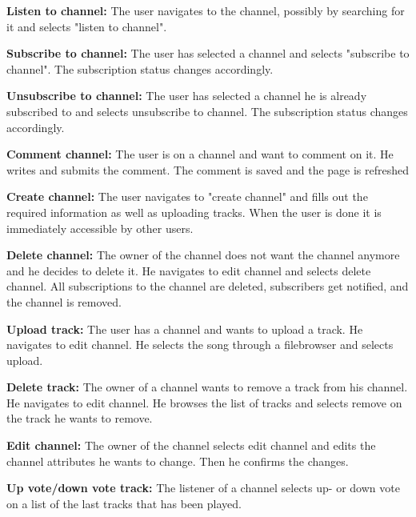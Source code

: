 \documentclass[a4paper,11pt,report]{article}
\begin{document}
\textbf{Listen to channel:}
The user navigates to the channel, possibly by searching for it and selects "listen to channel".

\textbf{Subscribe to channel:}
The user has selected a channel and selects "subscribe to channel". The subscription status changes accordingly.

\textbf{Unsubscribe to channel:}
The user has selected a channel he is already subscribed to and selects unsubscribe to channel. The subscription status changes accordingly.

\textbf{Comment channel:}
The user is on a channel and want to comment on it. He writes and submits the comment. The comment is saved and the page is refreshed

\textbf{Create channel:}
The user navigates to "create channel" and fills out the required information as well as uploading tracks. When the user is done it is immediately accessible by other users.

\textbf{Delete channel:}
The owner of the channel does not want the channel anymore and he decides to delete it. He navigates to edit channel and selects delete channel. All subscriptions to the channel are deleted, subscribers get notified, and the channel is removed.

\textbf{Upload track:}
The user has a channel and wants to upload a track. He navigates to edit channel. He selects the song through a filebrowser and selects upload.

\textbf{Delete track:}
The owner of a channel wants to remove a track from his channel. He navigates to edit channel. He browses the list of tracks and selects remove on the track he wants to remove.

\textbf{Edit channel:}
The owner of the channel selects edit channel and edits the channel attributes he wants to change. Then he confirms the changes.

\textbf{Up vote/down vote track:}
The listener of a channel selects up- or down vote on a list of the last tracks that has been played.
\end{document}
